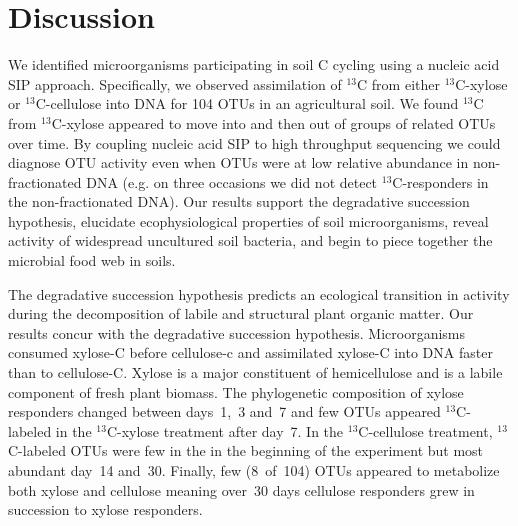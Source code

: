 \section{Discussion} 
We identified microorganisms participating in soil C cycling using a nucleic
acid SIP approach. Specifically, we observed assimilation of $^{13}$C from
either $^{13}$C-xylose or $^{13}$C-cellulose into DNA for 104 OTUs in an 
agricultural soil. We found $^{13}$C from $^{13}$C-xylose appeared to
move into and then out of groups of related OTUs over time. By coupling nucleic
acid SIP to high throughput sequencing we could diagnose OTU activity even when
OTUs were at low relative abundance in non-fractionated DNA (e.g. on three
occasions we did not detect $^{13}$C-responders in the non-fractionated DNA).
Our results support the degradative succession hypothesis, elucidate
ecophysiological properties of soil microorganisms, reveal activity of
widespread uncultured soil bacteria, and begin to piece together the microbial
food web in soils. 

The degradative succession hypothesis predicts an ecological transition in
activity during the decomposition of labile and structural plant organic
matter. Our results concur with the degradative succession hypothesis.
Microorganisms consumed xylose-C before cellulose-c and assimilated xylose-C
into DNA faster than to cellulose-C. Xylose is a major constituent of
hemicellulose and is a labile component of fresh plant biomass. The
phylogenetic composition of xylose responders changed between days~1,~3 and~7
and few OTUs appeared $^{13}$C-labeled in the $^{13}$C-xylose treatment after
day~7. In the $^{13}$C-cellulose treatment, $^{13}$C-labeled OTUs were few in
the in the beginning of the experiment but most abundant day~14 and~30. Finally,
few (8~of~104) OTUs appeared to metabolize both xylose and cellulose meaning
over~30 days cellulose responders grew in succession to xylose responders.

